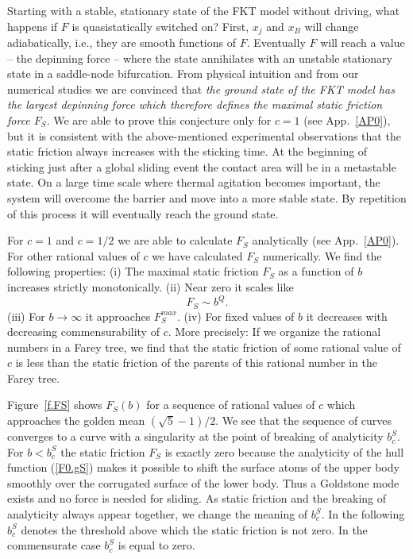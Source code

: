 Starting with a stable, stationary state of the FKT model without
driving, what happens if $F$ is quasistatically switched on? First,
$x_j$ and $x_B$ will change adiabatically, i.e., they are smooth
functions of $F$.  Eventually $F$ will reach a value -- the depinning
force -- where the state annihilates with an unstable stationary
state in a saddle-node bifurcation. From physical intuition and from
our numerical studies we are convinced that {\em the ground state of
the FKT model has the largest depinning force which therefore defines
the maximal static friction force $F_S$\/}. We are able to prove this
conjecture only for $c=1$ (see App.~\ref{AP0}), but it is consistent
with the above-mentioned experimental observations that the static
friction always increases with the sticking time. At the beginning of
sticking just after a global sliding event the contact area will be
in a metastable state.  On a large time scale where thermal agitation
becomes important, the system will overcome the barrier and move into
a more stable state. By repetition of this process it will eventually
reach the ground state.

For $c=1$ and $c=1/2$ we are able to calculate $F_S$ analytically (see
App.~\ref{AP0}). For other rational values of $c$ we have calculated
$F_S$ numerically. We find the following properties: (i) The maximal
static friction $F_S$ as a function of $b$ increases strictly
monotonically. (ii) Near zero it scales like 
\begin{equation}
  F_S\sim b^Q.
\end{equation}
(iii) For $b\to\infty$ it approaches $F_S^{max}$. (iv) For fixed
values of $b$ it decreases with decreasing commensurability of $c$.
More precisely: If we organize the rational numbers in a Farey 
tree\cite{remSTA.2}, we find that the static friction of some
rational value of $c$ is less than the static friction of the parents
of this rational number in the Farey tree. 

Figure~\ref{f.FS} shows $F_S(b)$ for a sequence of rational values of
$c$ which approaches the golden mean $(\sqrt{5}-1)/2$. We see that
the sequence of curves converges to a curve with a singularity at the
point of breaking of analyticity $b_c^S$. For $b<b_c^S$ the static
friction $F_S$ is exactly zero because the analyticity of the hull
function (\ref{F0.gS}) makes it possible to shift the surface atoms
of the upper body smoothly over the corrugated surface of the lower
body. Thus a Goldstone mode exists and no force is needed for
sliding. As static friction and the breaking of analyticity always
appear together, we change the meaning of $b_c^S$.  In the following
$b_c^S$ denotes the threshold above which the static friction is not
zero. In the commensurate case $b_c^S$ is equal to zero.

